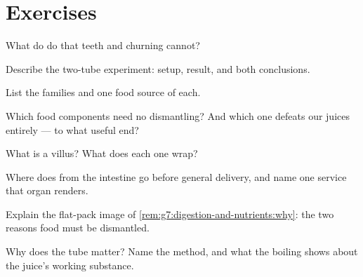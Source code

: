 \section{Exercises}

\begin{exercise}[$\star$]\label{exo:g7:digestion-and-nutrients:1}
What do  do that teeth and churning
cannot?
\end{exercise}

\begin{exercise}[$\star$]\label{exo:g7:digestion-and-nutrients:2}
Describe the two-tube  experiment: setup, result,
and both conclusions.
\end{exercise}

\begin{exercise}[$\star$]\label{exo:g7:digestion-and-nutrients:3}
List the  families and one food source of each.
\end{exercise}

\begin{exercise}[$\star$]\label{exo:g7:digestion-and-nutrients:4}
Which food components need no dismantling? And which one
defeats our juices entirely --- to what useful end?
\end{exercise}

\begin{exercise}[$\star$]\label{exo:g7:digestion-and-nutrients:5}
What is a villus? What does each one wrap?
\end{exercise}

\begin{exercise}[$\star$]\label{exo:g7:digestion-and-nutrients:6}
Where does  from the intestine go before general
delivery, and name one service that organ renders.
\end{exercise}

\begin{exercise}[$\star\star$]\label{exo:g7:digestion-and-nutrients:7}
Explain the flat-pack image of
\cref{rem:g7:digestion-and-nutrients:why}: the two reasons
food must be dismantled.
\end{exercise}

\begin{exercise}[$\star\star$]\label{exo:g7:digestion-and-nutrients:8}
Why does the  tube matter? Name the method,
and what the boiling shows about the juice's working
substance.
\end{exercise}

